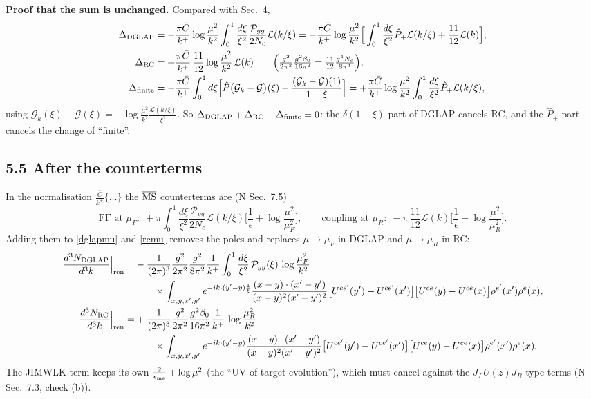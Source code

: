 \documentclass[10pt]{article}
\numberwithin{equation}{section}
\newcommand{\Wop}[2]{\big[U^{ce'}(#2)-U^{ce'}(x')\big]\big[U^{ce}(#1)-U^{ce}(x)\big]\rho^{e'}(x')\rho^{e}(x)}
\newcommand{\Kx}[2]{\frac{(x-#1)\cdot(x'-#2)}{(x-#1)^{2}(x'-#2)^{2}}}
\newcommand{\Cb}{\bar C}
\newcommand{\Ph}{\hat P}
\newcommand{\Lc}{\mathcal L}
\begin{document}
\textbf{Proof that the sum is unchanged.} Compared with Sec.~4,
\begin{align}
\Delta_{\rm DGLAP}&=-\frac{\pi\Cb}{k^+}\log\frac{\mu^2}{k^2}\int_0^1\frac{d\xi}{\xi^2}\frac{\mathcal P_{gg}}{2N_c}\Lc(k/\xi)
=-\frac{\pi\Cb}{k^+}\log\frac{\mu^2}{k^2}\Big[\int_0^1\frac{d\xi}{\xi^2}\Ph_+\Lc(k/\xi)+\frac{11}{12}\Lc(k)\Big],\\
\Delta_{\rm RC}&=+\frac{\pi\Cb}{k^+}\,\frac{11}{12}\log\frac{\mu^2}{k^2}\,\Lc(k)\qquad\Big(\tfrac{g^2}{2\pi^2}\tfrac{g^2\beta_0}{16\pi^2}=\tfrac{11}{12}\tfrac{g^4N_c}{8\pi^4}\Big),\\
\Delta_{\rm finite}&=-\frac{\pi\Cb}{k^+}\int_0^1d\xi\Big[\Ph\big(\mathcal G_k-\mathcal G\big)(\xi)-\frac{(\mathcal G_k-\mathcal G)(1)}{1-\xi}\Big]
=+\frac{\pi\Cb}{k^+}\log\frac{\mu^2}{k^2}\int_0^1\frac{d\xi}{\xi^2}\Ph_+\Lc(k/\xi),
\end{align}
using $\mathcal G_k(\xi)-\mathcal G(\xi)=-\log\frac{\mu^2}{k^2}\frac{\Lc(k/\xi)}{\xi^2}$. So
$\Delta_{\rm DGLAP}+\Delta_{\rm RC}+\Delta_{\rm finite}=0$: the $\delta(1-\xi)$ part of DGLAP cancels RC, and the $\Ph_+$ part
cancels the change of ``finite''.

\subsection*{5.5 After the counterterms}
In the normalisation $\frac{\Cb}{k^+}\{\dots\}$ the $\overline{\rm MS}$ counterterms are (N Sec.~7.5)
\begin{equation}
\text{FF at }\mu_F:\;+\pi\int_0^1\frac{d\xi}{\xi^2}\frac{\mathcal P_{gg}}{2N_c}\Lc(k/\xi)\Big[\frac1\epsilon+\log\frac{\mu^2}{\mu_F^2}\Big],\qquad
\text{coupling at }\mu_R:\;-\pi\,\frac{11}{12}\Lc(k)\Big[\frac1\epsilon+\log\frac{\mu^2}{\mu_R^2}\Big].
\end{equation}
Adding them to \eqref{dglapmu} and \eqref{rcmu} removes the poles and replaces $\mu\to\mu_F$ in DGLAP and $\mu\to\mu_R$ in RC:
\begin{align}
\frac{d^{3}N_{\rm DGLAP}}{d^{3}k}\Big|_{\rm ren}=&-\frac{1}{(2\pi)^{3}}\frac{g^{2}}{2\pi^{2}}\frac{g^{2}}{8\pi^{2}}\frac{1}{k^{+}}\int_{0}^{1}\frac{d\xi}{\xi^{2}}\,\mathcal P_{gg}(\xi)\,\log\frac{\mu_F^{2}}{k^{2}}\notag\\
&\qquad\times\int_{x,y,x',y'}e^{-ik\cdot(y'-y)\frac{1}{\xi}}\Kx{y}{y'}\Wop{y}{y'},\label{dglapren}\\
\frac{d^{3}N_{\rm RC}}{d^{3}k}\Big|_{\rm ren}=&+\frac{1}{(2\pi)^{3}}\frac{g^{2}}{2\pi^{2}}\frac{g^{2}\beta_{0}}{16\pi^{2}}\frac{1}{k^{+}}\,\log\frac{\mu_R^{2}}{k^{2}}\notag\\
&\qquad\times\int_{x,y,x',y'}e^{-ik\cdot(y'-y)}\Kx{y}{y'}\Wop{y}{y'}.\label{rcren}
\end{align}
The JIMWLK term keeps its own $\frac{2}{\epsilon_{\rm me}}+\log\mu^2$ (the ``UV of target evolution''), which must cancel
against the $J_LU(z)J_R$-type terms (N Sec.~7.3, check (b)).
\end{document}
